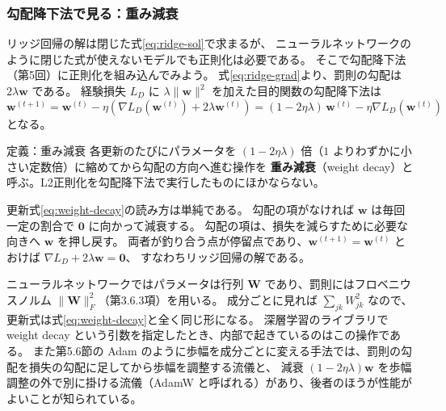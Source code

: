 \subsubsection{勾配降下法で見る：重み減衰}

リッジ回帰の解は閉じた式\eqref{eq:ridge-sol}で求まるが、
ニューラルネットワークのように閉じた式が使えないモデルでも正則化は必要である。
そこで勾配降下法（第5回）に正則化を組み込んでみよう。
式\eqref{eq:ridge-grad}より、罰則の勾配は $2\lambda\bm{w}$ である。
経験損失 $L_D$ に $\lambda\|\bm{w}\|^2$ を加えた目的関数の勾配降下法は
\begin{equation}
  \bm{w}^{(t+1)} = \bm{w}^{(t)} - \eta\left( \nabla L_D(\bm{w}^{(t)}) + 2\lambda\bm{w}^{(t)} \right)
  = (1 - 2\eta\lambda)\,\bm{w}^{(t)} - \eta\nabla L_D(\bm{w}^{(t)})
  \label{eq:weight-decay}
\end{equation}
となる。

\begin{itembox}[l]{定義：重み減衰}
各更新のたびにパラメータを $(1 - 2\eta\lambda)$ 倍（$1$ よりわずかに小さい定数倍）に縮めてから勾配の方向へ進む操作を
\textbf{重み減衰}（weight decay）と呼ぶ。L2正則化を勾配降下法で実行したものにほかならない。
\end{itembox}

更新式\eqref{eq:weight-decay}の読み方は単純である。
勾配の項がなければ $\bm{w}$ は毎回一定の割合で $\bm{0}$ に向かって減衰する。
勾配の項は、損失を減らすために必要な向きへ $\bm{w}$ を押し戻す。
両者が釣り合う点が停留点であり、$\bm{w}^{(t+1)} = \bm{w}^{(t)}$ とおけば $\nabla L_D + 2\lambda\bm{w} = \bm{0}$、
すなわちリッジ回帰の解である。

ニューラルネットワークではパラメータは行列 $\bm{W}$ であり、罰則にはフロベニウスノルム $\|\bm{W}\|_F^2$（第3.6.3項）を用いる。
成分ごとに見れば $\sum_{jk} W_{jk}^2$ なので、更新式は式\eqref{eq:weight-decay}と全く同じ形になる。
深層学習のライブラリで weight decay という引数を指定したとき、内部で起きているのはこの操作である。
また第5.6節の Adam のように歩幅を成分ごとに変える手法では、罰則の勾配を損失の勾配に足してから歩幅を調整する流儀と、
減衰 $(1 - 2\eta\lambda)\bm{w}$ を歩幅調整の外で別に掛ける流儀（AdamW と呼ばれる）があり、後者のほうが性能がよいことが知られている。

